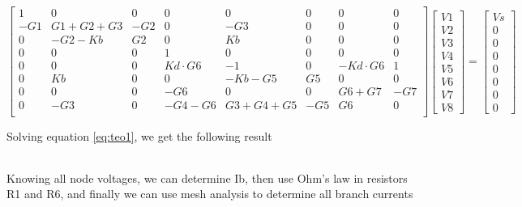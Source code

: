 \begin{equation}
\label{eq:teo1}
	\begin{bmatrix}
	1 & 0 & 0 & 0 & 0 & 0 & 0 & 0 \\ -G1 & G1+G2+G3 & -G2 & 0 & -G3 & 0 & 0 & 0 \\ 0 & -G2-Kb & G2 & 0 & Kb & 0 & 0 & 0 \\ 0 & 0 & 0 & 1 & 0 & 0 & 0 & 0 \\ 0 & 0 & 0 & Kd \cdot G6 & -1 & 0 & -Kd 		\cdot G6 & 1 \\ 0 & Kb & 0 & 0 & -Kb-G5 & G5 & 0 & 0 \\ 0 & 0 & 0 & -G6 & 0 & 0 & G6+G7 & -G7 \\ 0 & -G3 & 0 & -G4-G6 & G3+G4+G5 & -G5 & G6 & 0 \\
	\end{bmatrix}
	\begin{bmatrix}
	V1 \\ V2 \\ V3 \\ V4 \\ V5 \\ V6 \\ V7 \\ V8
	\end{bmatrix}
	=
	\begin{bmatrix}
	Vs \\ 0 \\ 0 \\ 0 \\ 0 \\ 0 \\ 0 \\ 0
	\end{bmatrix}
\end{equation}

\par Solving equation \ref{eq:teo1}, we get the following result

\begin{table}[H]
\centering
\begin{tabularx}{0.8\textwidth} {
  | >{\raggedright\arraybackslash}X
  | >{\raggedleft\arraybackslash}X | }
 \hline
 
\end{tabularx}
\end{table}

\par Knowing all node voltages, we can determine Ib, then use Ohm's law in resistors R1 and R6, and finally we can use mesh analysis to determine all branch currents

